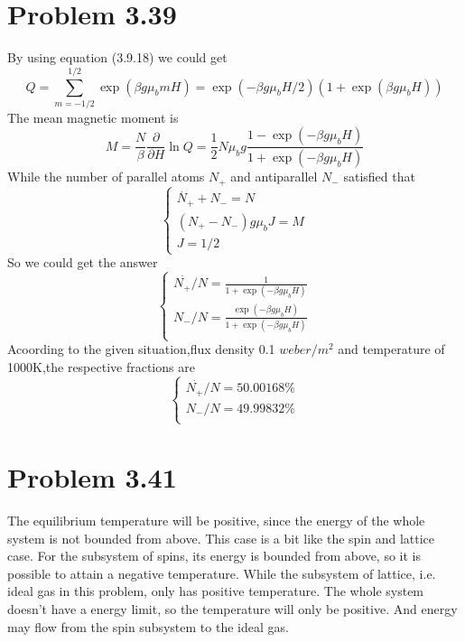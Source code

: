 \documentclass{article}
\begin{document}
\section*{Problem 3.39}
	By using equation (3.9.18) we could get
	\begin{equation*}
		Q=\sum_{m=-1/2}^{1/2}\exp(\beta g \mu_b mH)=\exp(-\beta g \mu_b H/2)(1+\exp(\beta g \mu_b H))
	\end{equation*}
	The mean magnetic moment is
	\begin{equation*}
		M=\frac{N}{\beta}\frac{\partial}{\partial H}\ln Q=\frac{1}{2}N\mu_b g\frac{1-\exp(-\beta g \mu_b H)}{1+\exp(-\beta g \mu_b H)}
	\end{equation*}
	While the number of parallel atoms $N_+$ and antiparallel $N_-$ satisfied that
	\begin{equation}
		\left\{
		\begin{aligned}
		\overset{.} N_+ +N_- =N\\
		(N_+ -N_-) g \mu_b J =M\\
		J=1/2
		\end{aligned}
		\right.
	\end{equation}
	So we could get the answer
	\begin{equation}
		\left\{
		\begin{aligned}
		\overset{.}
		{N_+}/{N}=\frac{1}{1+\exp(-\beta g \mu_b H)}\\
		{N_-}/{N} =\frac{\exp(-\beta g \mu_b H)}{1+\exp(-\beta g \mu_b H)}\\
		\end{aligned}
		\right.
	\end{equation}
	Acoording to the given situation,flux density 0.1 $weber/m^2$ and temperature of 1000K,the respective fractions are
	\begin{equation}
		\left\{
		\begin{aligned}
		\overset{.}
		{N_+}/{N}=50.00168\%\\
		{N_-}/{N} =49.99832\%\\
		\end{aligned}
		\right.
	\end{equation}
	
\section*{Problem 3.41}
	The equilibrium temperature will be positive, since the energy of the whole system is not bounded from above. This case is a bit like the spin and lattice case. For the subsystem of spins, its energy is bounded from above, so it is possible to attain a negative temperature. While the subsystem of lattice, i.e. ideal gas in this problem, only has positive temperature. The whole system doesn't have a energy limit, so the temperature will only be positive. And energy may flow from the spin subsystem to the ideal gas.
\end{document}
